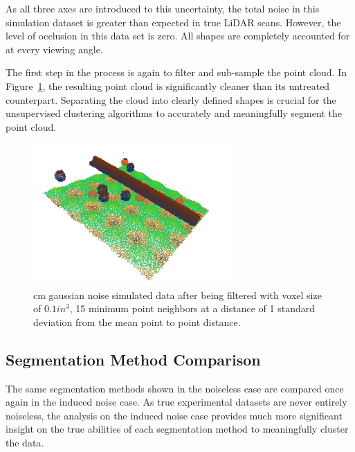 \documentclass[12pt]{drexelthesis}
\let\Oldsubsection\subsection
\renewcommand{\subsection}{\FloatBarrier\Oldsubsection}
\begin{document}
As all three axes are introduced to this uncertainty, the total noise in this simulation dataset is greater than expected in true LiDAR scans. However, the level of occlusion in this data set is zero. All shapes are completely accounted for at every viewing angle.

The first step in the process is again to filter and sub-sample the point cloud. In Figure~\ref{2cmnoise:filtered}, the resulting point cloud is significantly cleaner than its untreated counterpart. Separating the cloud into clearly defined shapes is crucial for the unsupervised clustering algorithms to accurately and meaningfully segment the point cloud. 

\begin{figure}[!ht]
	
	\centering
		\includegraphics[width=3in]{simulated-lab-scan/2cmnoise/DS01k15std1.jpg}
		\caption[2 cm gaussian noise simulated data after being filtered with voxel size of 0.1 $in^{3}$, 15 minimum point neighbors at a distance of 1 standard deviation from the mean point to point distance]{ cm gaussian noise simulated data after being filtered with voxel size of $0.1 in^{3}$, 15 minimum point neighbors at a distance of 1 standard deviation from the mean point to point distance.}
\label{2cmnoise:filtered}
\end{figure}


\subsection{Segmentation Method Comparison}

The same segmentation methods shown in the noiseless case are compared once again in the induced noise case. As true experimental datasets are never entirely noiseless, the analysis on the induced noise case provides much more significant insight on the true abilities of each segmentation method to meaningfully cluster the data.
\end{document}
